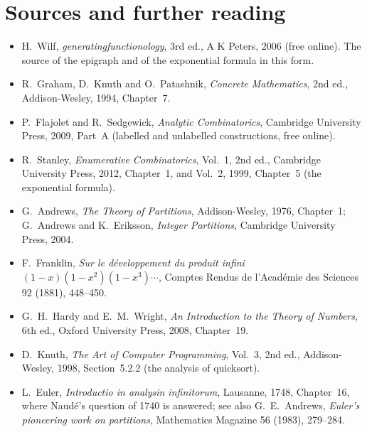 \section*{Sources and further reading}

\begin{itemize}
\item H.~Wilf, \emph{generatingfunctionology}, 3rd ed., A K Peters, 2006 (free online). The source of the epigraph and of
the exponential formula in this form.
\item R.~Graham, D.~Knuth and O.~Patashnik, \emph{Concrete Mathematics}, 2nd ed., Addison-Wesley, 1994, Chapter~7.
\item P.~Flajolet and R.~Sedgewick, \emph{Analytic Combinatorics}, Cambridge University Press, 2009, Part~A (labelled and
unlabelled constructions, free online).
\item R.~Stanley, \emph{Enumerative Combinatorics}, Vol.~1, 2nd ed., Cambridge University Press, 2012, Chapter~1, and
Vol.~2, 1999, Chapter~5 (the exponential formula).
\item G.~Andrews, \emph{The Theory of Partitions}, Addison-Wesley, 1976, Chapter~1; G.~Andrews and K.~Eriksson,
\emph{Integer Partitions}, Cambridge University Press, 2004.
\item F.~Franklin, \emph{Sur le d\'eveloppement du produit infini $(1-x)(1-x^2)(1-x^3)\cdots$}, Comptes Rendus de
l'Acad\'emie des Sciences 92 (1881), 448--450.
\item G.~H.~Hardy and E.~M.~Wright, \emph{An Introduction to the Theory of Numbers}, 6th ed., Oxford University Press,
2008, Chapter~19.
\item D.~Knuth, \emph{The Art of Computer Programming}, Vol.~3, 2nd ed., Addison-Wesley, 1998, Section~5.2.2 (the analysis of
quicksort).
\item L.~Euler, \emph{Introductio in analysin infinitorum}, Lausanne, 1748, Chapter~16, where Naud\'e's question of 1740 is answered; see also G.~E.~Andrews, \emph{Euler's pioneering work on partitions}, Mathematics Magazine 56 (1983), 279--284.
\end{itemize}
